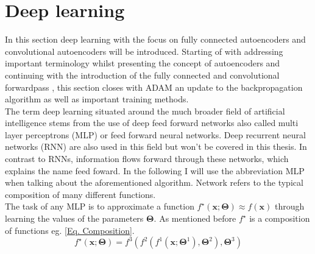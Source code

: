 \documentclass[12pt, a4paper]{article}
\begin{document}
\section{Deep learning}
In this section deep learning with the focus on fully connected autoencoders and convolutional autoencoders will be introduced. Starting of with addressing important terminology whilst presenting the concept of autoencoders and continuing with the introduction of the fully connected and convolutional forwardpass , this section closes with ADAM \cite{the} an update to the backpropagation algorithm as well as important training methods.\\ 
The term deep learning situated around the much broader field of artificial intelligence stems from the use of deep feed forward networks also called multi layer perceptrons (MLP) or feed forward neural networks. Deep recurrent neural networks (RNN) are also used in this field but won't be covered in this thesis. In contrast to RNNs, information flows forward through these networks, which explains the name feed foward. In the following I will use the abbreviation MLP when talking about the aforementioned algorithm. Network refers to the typical composition of many different functions.\\The task of any MLP is to approximate a function \(f^\star(\mathbf{x};\mathbf{\Theta}) \approx f(\mathbf{x})\) through learning the values of the parameters \(\mathbf{\Theta}\). As mentioned before  \(f^\star\) is a composition of functions eg. \cref{Eq. Composition}.
\begin{equation}
	 f^\star(\mathbf{x};\mathbf{\Theta})= f^3(f^2(f^1(\mathbf{x};\mathbf{\Theta}^1),\mathbf{\Theta}^2),\mathbf{\Theta}^3)
	 \label{Eq. Composition}
\end{equation}
\end{document}
